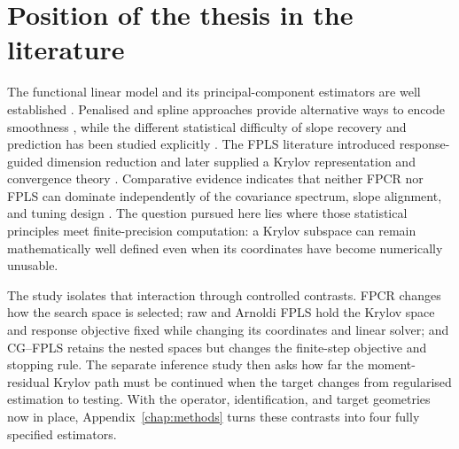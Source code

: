 \section{Position of the thesis in the literature}
\label{sec:literature-positioning}

The functional linear model and its principal-component estimators are well established \parencite{cardot_ferraty_sarda_1999,hall_horowitz_2007}. Penalised and spline approaches provide alternative ways to encode smoothness \parencite{crambes_kneip_sarda_2009}, while the different statistical difficulty of slope recovery and prediction has been studied explicitly \parencite{cai_hall_2006}. The FPLS literature introduced response-guided dimension reduction and later supplied a Krylov representation and convergence theory \parencite{preda_saporta_2005,delaigle_hall_2012}. Comparative evidence indicates that neither FPCR nor FPLS can dominate independently of the covariance spectrum, slope alignment, and tuning design \parencite{febrero_bande_et_al_2017}. The question pursued here lies where those statistical principles meet finite-precision computation: a Krylov subspace can remain mathematically well defined even when its coordinates have become numerically unusable.

The study isolates that interaction through controlled contrasts. FPCR changes how the search space is selected; raw and Arnoldi FPLS hold the Krylov space and response objective fixed while changing its coordinates and linear solver; and CG--FPLS retains the nested spaces but changes the finite-step objective and stopping rule. The separate inference study then asks how far the moment-residual Krylov path must be continued when the target changes from regularised estimation to testing. With the operator, identification, and target geometries now in place, Appendix~\ref{chap:methods} turns these contrasts into four fully specified estimators.
